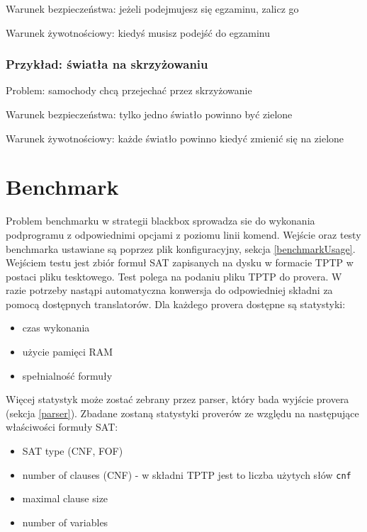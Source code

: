 \documentclass[a4paper,12pt]{article}
\begin{document}
\begin{itemize}
\noindent
Warunek bezpieczeństwa: jeżeli podejmujesz się egzaminu, zalicz go

\noindent
Warunek żywotnościowy: kiedyś musisz podejść do egzaminu

\subsubsection{Przykład: światła na skrzyżowaniu}

\noindent
Problem: samochody chcą przejechać przez skrzyżowanie

\noindent
Warunek bezpieczeństwa: tylko jedno światło powinno być zielone

\noindent
Warunek żywotnościowy: każde światło powinno kiedyć zmienić się na zielone


\section{Benchmark}

Problem benchmarku w strategii blackbox sprowadza sie do wykonania podprogramu z odpowiednimi opcjami z poziomu linii komend.
Wejście oraz testy benchmarka ustawiane są poprzez plik konfiguracyjny, sekcja \ref{benchmarkUsage}.  Wejściem testu jest zbiór formuł \gls{SAT} zapisanych na dysku w formacie TPTP w postaci pliku tesktowego. Test polega na podaniu pliku TPTP do provera. W razie potrzeby nastąpi automatyczna konwersja do odpowiedniej składni za pomocą dostępnych translatorów.
Dla każdego provera dostępne są statystyki:

\begin{itemize}
  \item czas wykonania
  \item użycie pamięci RAM
  \item spełnialność formuły
\end{itemize}

\noindent
Więcej statystyk może zostać zebrany przez parser, który bada wyjście provera (sekcja \ref{parser}).
\newline
Zbadane zostaną statystyki proverów ze względu na następujące właściwości formuły SAT:

\begin{itemize}
  \item SAT type (CNF, FOF)
  \item number of clauses (CNF) - w składni TPTP jest to liczba użytych słów \texttt{cnf}
  \item maximal clause size
  \item number of variables
\end{itemize}




\end{itemize}
\end{document}
